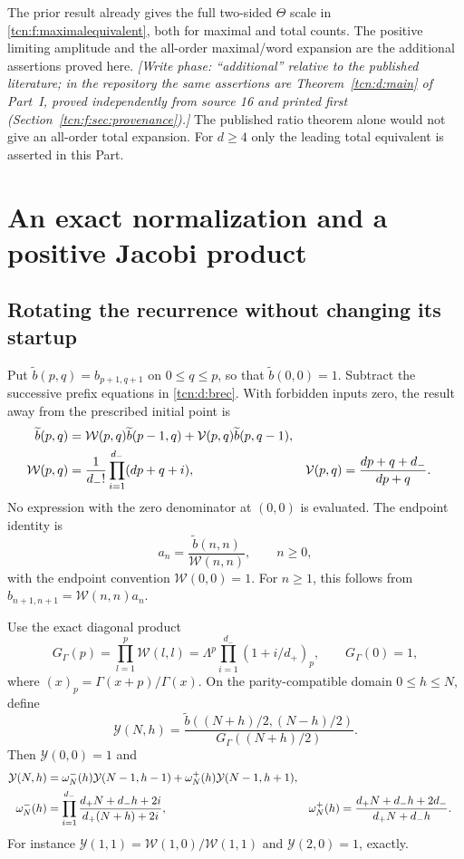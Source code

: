 \documentclass[11pt,letterpaper]{article}
\theoremstyle{remark}
\begin{document}
The prior result \cite[Theorem 1.8]{Chang2024} already gives the full two-sided $\Theta$ scale in \eqref{tcn:f:maximalequivalent}, both for maximal and total counts. The positive limiting amplitude and the all-order maximal/word expansion are the additional assertions proved here. \emph{[Write phase: ``additional'' relative to the published literature; in the repository the same assertions are Theorem~\ref{tcn:d:main} of Part~I, proved independently from source 16 and printed first (Section~\ref{tcn:f:sec:provenance}).]} The published ratio theorem alone would not give an all-order total expansion. For $d\ge4$ only the leading total equivalent is asserted in this Part.

\section{An exact normalization and a positive Jacobi product}\label{tcn:f:sec:exact}
\subsection{Rotating the recurrence without changing its startup}
Put $\widetilde b(p,q)=b_{p+1,q+1}$ on $0\le q\le p$, so that $\widetilde b(0,0)=1$. Subtract the successive prefix equations in \eqref{tcn:d:brec}. With forbidden inputs zero, the result away from the prescribed initial point is
\begin{align}
 \widetilde b(p,q)&=\mathcal W(p,q)\widetilde b(p-1,q)+\mathcal V(p,q)\widetilde b(p,q-1),\label{tcn:f:B}\\
 \mathcal W(p,q)&=\frac1{d_-!}\prod_{i=1}^{d_-}(dp+q+i),&
 \mathcal V(p,q)&=\frac{dp+q+d_-}{dp+q}.\notag
\end{align}
No expression with the zero denominator at $(0,0)$ is evaluated. The endpoint identity is
\begin{equation}\label{tcn:f:endpointexact}
 a_n=\frac{\widetilde b(n,n)}{\mathcal W(n,n)},\qquad n\ge0,
\end{equation}
with the endpoint convention $\mathcal W(0,0)=1$. For $n\ge1$, this follows from $b_{n+1,n+1}=\mathcal W(n,n)a_n$.

Use the exact diagonal product
\begin{equation}\label{tcn:f:G}
 G_\Gamma(p)=\prod_{l=1}^p\mathcal W(l,l)
 =\Lambda^p\prod_{i=1}^{d_-}(1+i/d_+)_p,\qquad G_\Gamma(0)=1,
\end{equation}
where $(x)_p=\Gamma(x+p)/\Gamma(x)$. On the parity-compatible domain $0\le h\le N$, define
\[
 \mathcal Y(N,h)=\frac{\widetilde b((N+h)/2,(N-h)/2)}{G_\Gamma((N+h)/2)}.
\]
Then $\mathcal Y(0,0)=1$ and
\begin{align}
 \mathcal Y(N,h)&=\omega^-_N(h)\mathcal Y(N-1,h-1)+\omega^+_N(h)\mathcal Y(N-1,h+1),\label{tcn:f:onestep}\\
 \omega^-_N(h)&=\prod_{i=1}^{d_-}\frac{d_+N+d_-h+2i}{d_+(N+h)+2i},&
 \omega^+_N(h)&=\frac{d_+N+d_-h+2d_-}{d_+N+d_-h}.\notag
\end{align}
For instance $\mathcal Y(1,1)=\mathcal W(1,0)/\mathcal W(1,1)$ and $\mathcal Y(2,0)=1$, exactly.
\end{document}
